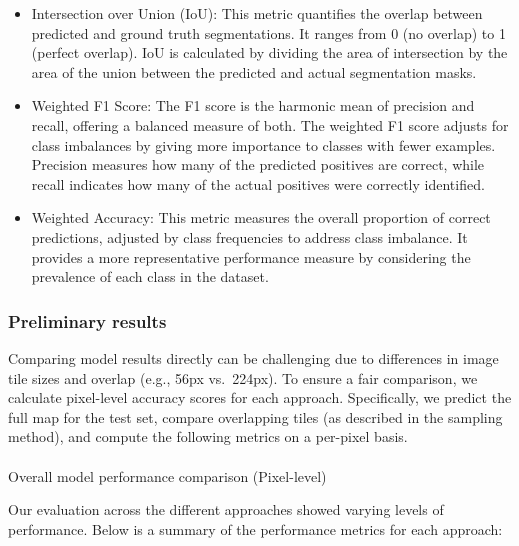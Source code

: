 \documentclass[
  letterpaper,
  DIV=11,
  numbers=noendperiod]{scrartcl}
\makeatletter
\let\oldparagraph\paragraph
\renewcommand{\paragraph}{
    \@ifstar
      \xxxParagraphStar
      \xxxParagraphNoStar
  }
\newcommand{\xxxParagraphStar}[1]{\oldparagraph*{#1}\mbox{}}
\newcommand{\xxxParagraphNoStar}[1]{\oldparagraph{#1}\mbox{}}
\makeatother
\begin{document}
\begin{itemize}
\item
  Intersection over Union (IoU): This metric quantifies the overlap
  between predicted and ground truth segmentations. It ranges from 0 (no
  overlap) to 1 (perfect overlap). IoU is calculated by dividing the
  area of intersection by the area of the union between the predicted
  and actual segmentation masks.
\item
  Weighted F1 Score: The F1 score is the harmonic mean of precision and
  recall, offering a balanced measure of both. The weighted F1 score
  adjusts for class imbalances by giving more importance to classes with
  fewer examples. Precision measures how many of the predicted positives
  are correct, while recall indicates how many of the actual positives
  were correctly identified.
\item
  Weighted Accuracy: This metric measures the overall proportion of
  correct predictions, adjusted by class frequencies to address class
  imbalance. It provides a more representative performance measure by
  considering the prevalence of each class in the dataset.
\end{itemize}

\subsubsection{Preliminary results}\label{preliminary-results-1}

Comparing model results directly can be challenging due to differences
in image tile sizes and overlap (e.g., 56px vs.~224px). To ensure a fair
comparison, we calculate pixel-level accuracy scores for each approach.
Specifically, we predict the full map for the test set, compare
overlapping tiles (as described in the sampling method), and compute the
following metrics on a per-pixel basis.

\paragraph{Overall model performance comparison
(Pixel-level)}\label{overall-model-performance-comparison-pixel-level}

Our evaluation across the different approaches showed varying levels of
performance. Below is a summary of the performance metrics for each
approach:
\end{document}
